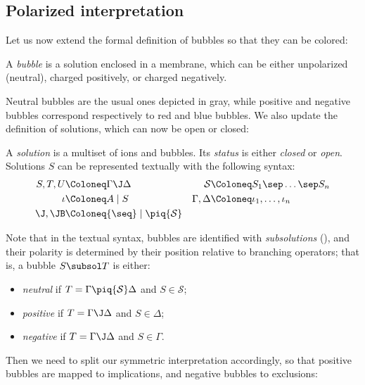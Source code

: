 \subsection{Polarized interpretation}

Let us now extend the formal definition of bubbles so that they can be colored:

\begin{definition}[Bubble]
  A \emph{bubble} is a solution enclosed in a membrane, which can be either
  unpolarized (neutral), charged positively, or charged negatively.
\end{definition}

Neutral bubbles are the usual ones depicted in gray, while positive and negative
bubbles correspond respectively to red and blue bubbles. We also update the
definition of solutions, which can now be open or closed:

\begin{definition}[Solution]
  
  A \emph{solution} is a multiset of ions and bubbles. Its \emph{status} is
  either \emph{closed} or \emph{open}. Solutions $S$ can be represented
  textually with the following syntax:
  \begin{align*}
    S, T, U &\Coloneq \Gamma \J \Delta &
    \mathcal{S} &\Coloneq S_1 \sep \ldots \sep S_n \\
    \iota &\Coloneq A \mid S &
    \Gamma, \Delta &\Coloneq \iota_1, \ldots, \iota_n \\
    \J, \JB &\Coloneq {\seq} \mid {\piq{\mathcal{S}}} &&
  \end{align*}
\end{definition}

Note that in the textual syntax, bubbles are identified with \emph{subsolutions}
(), and their polarity is determined by their position
relative to branching operators; that is, a bubble $S \subsol T$ is either:
\begin{itemize}
  \item \emph{neutral} if $T = \Gamma \piq{\mathcal{S}} \Delta$ and $S \in
  \mathcal{S}$;
  \item \emph{positive} if $T = \Gamma \J \Delta$ and $S \in \Delta$;
  \item \emph{negative} if $T = \Gamma \J \Delta$ and $S \in \Gamma$.
\end{itemize}

Then we need to split our symmetric interpretation accordingly, so that positive
bubbles are mapped to implications, and negative bubbles to
exclusions:

